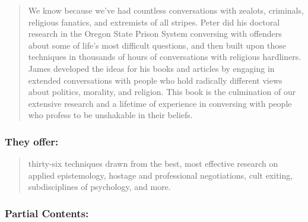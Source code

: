 \documentclass[10pt,titlepage]{book}
\begin{document}
\begin{quote}
  We know because we’ve had countless conversations with zealots, criminals, religious fanatics, and extremists of all stripes.
  Peter did his doctoral research in the Oregon State Prison System conversing with offenders about some of life’s most difficult questions, and then built upon those techniques in thousands of hours of conversations with religious hardliners.
  James developed the ideas for his books and articles by engaging in extended conversations with people who hold radically different views about politics, morality, and religion.
  This book is the culmination of our extensive research and a lifetime of experience in conversing with people who profess to be unshakable in their beliefs.
\end{quote}

\subsubsection{They offer:}

\begin{quote}
thirty-six techniques drawn from the best, most effective research on applied epistemology, hostage and professional negotiations, cult exiting, subdisciplines of psychology, and more.
\end{quote}

\subsubsection{Partial Contents:}
\end{document}
